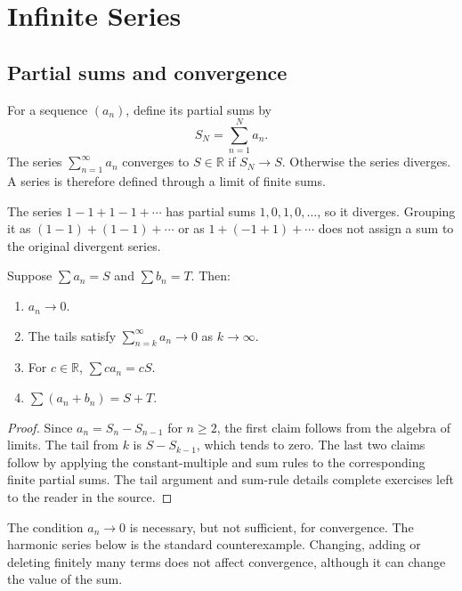 \chapter{Infinite Series}\label{chap:analysis-series}

\section{Partial sums and convergence}
\begin{definition}
For a sequence $(a_n)$, define its partial sums by
\[
S_N=\sum_{n=1}^N a_n.
\]
The series $\sum_{n=1}^{\infty}a_n$ converges to $S\in\mathbb R$ if
$S_N\to S$. Otherwise the series diverges. A series is therefore defined
through a limit of finite sums.
\end{definition}
\begin{example}
The series $1-1+1-1+\cdots$ has partial sums $1,0,1,0,\ldots$, so it diverges.
Grouping it as $(1-1)+(1-1)+\cdots$ or as $1+(-1+1)+\cdots$ does not
assign a sum to the original divergent series.
\end{example}

\begin{proposition}
Suppose $\sum a_n=S$ and $\sum b_n=T$. Then:
\begin{enumerate}
\item $a_n\to0$.
\item The tails satisfy $\sum_{n=k}^{\infty}a_n\to0$ as $k\to\infty$.
\item For $c\in\mathbb R$, $\sum ca_n=cS$.
\item $\sum(a_n+b_n)=S+T$.
\end{enumerate}
\end{proposition}
\begin{proof}
Since $a_n=S_n-S_{n-1}$ for $n\geq2$, the first claim follows from the
algebra of limits. The tail from $k$ is $S-S_{k-1}$, which tends to zero.
The last two claims follow by applying the constant-multiple and sum rules
to the corresponding finite partial sums. The tail argument and sum-rule
details complete exercises left to the reader in the source.
\end{proof}
\begin{remark}
The condition $a_n\to0$ is necessary, but not sufficient, for convergence.
The harmonic series below is the standard counterexample.
Changing, adding or deleting finitely many terms does not affect convergence,
although it can change the value of the sum.
\end{remark}

